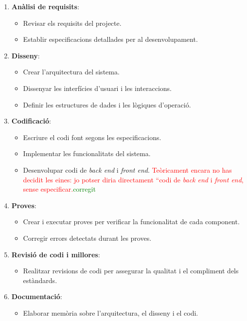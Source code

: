 \documentclass[a4paper,12pt,twoside]{ThesisStyle}
\newcommand{\pau}[1]{\textcolor{red}{#1}}
\newcommand{\sudan}[1]{\textcolor{green}{#1}}
\begin{document}
\begin{enumerate}
  \item \textbf{Anàlisi de requisits}:
  \begin{itemize}
      \item Revisar els requisits del projecte.
      \item Establir especificacions detallades per al desenvolupament.
  \end{itemize}

  \item \textbf{Disseny}:
  \begin{itemize}
      \item Crear l'arquitectura del sistema.
      \item Dissenyar les interfícies d'usuari i les interaccions.
      \item Definir les estructures de dades i les lògiques d'operació.
  \end{itemize}

  \item \textbf{Codificació}:
  \begin{itemize}
      \item Escriure el codi font segons les especificacions.
      \item Implementar les funcionalitats del sistema.
      \item Desenvolupar codi de \textit{back end} i \textit{front end}. 
      \pau{Teòricament encara no has decidit les eines: jo potser diria directament ``codi de \textit{back end} i \textit{front end}, sense especificar.}\sudan{corregit}
  \end{itemize}

  \item \textbf{Proves}:
  \begin{itemize}
      \item Crear i executar proves per verificar la funcionalitat de cada component.
      \item Corregir errors detectats durant les proves.
  \end{itemize}

  \item \textbf{Revisió de codi i millores}:
  \begin{itemize}
      \item Realitzar revisions de codi per assegurar la qualitat i el compliment dels estàndards.
  \end{itemize}

  \item \textbf{Documentació}:
  \begin{itemize}
      \item Elaborar memòria sobre l'arquitectura, el disseny i el codi.
  \end{itemize}


\end{enumerate}
\end{document}
